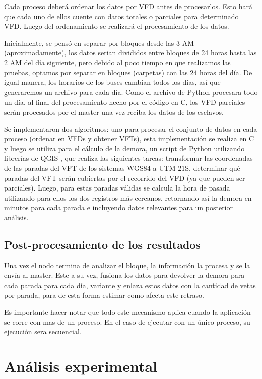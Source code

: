 \documentclass[journal]{IEEEtran}
\begin{document}
Cada proceso deberá ordenar los datos por VFD antes de procesarlos. Esto hará que cada uno de ellos cuente con datos totales o parciales para determinado VFD. Luego del ordenamiento se realizará el procesamiento de los datos.

Inicialmente, se pensó en separar por bloques desde las 3 AM (aproximadamente), los datos serian divididos entre bloques de 24 horas hasta las 2 AM del día siguiente, pero debido al poco tiempo en que realizamos las pruebas, optamos por separar en bloques (carpetas) con las 24 horas del día. De igual manera, los horarios de los buses cambian todos los días, así que generaremos un archivo para cada día. Como el archivo de Python procesara todo un día, al final del procesamiento hecho por el código en C, los VFD parciales serán procesados por el master una vez reciba los datos de los esclavos.

Se implementaron dos algoritmos: uno para procesar el
conjunto de datos en cada proceso (ordenar en VFDs y obtener VFTs), esta implementación se realiza en C y luego se utiliza para el cálculo de la demora, un script de Python utilizando librerías de QGIS \cite{qgis}, que realiza las siguientes tareas: transformar las coordenadas de las paradas del VFT de los sistemas WGS84 a UTM 21S, determinar qué paradas del VFT serán cubiertas por el recorrido del VFD (ya que pueden ser parciales). Luego, para estas paradas válidas se calcula la hora de pasada utilizando para ellos los dos registros más cercanos, retornando así la demora en minutos para cada parada e incluyendo datos relevantes para un posterior análisis. 

\subsection{Post-procesamiento de los resultados}
Una vez el nodo termina de analizar el bloque, la información la procesa y se la envía al master. Este a su vez, fusiona los datos para devolver la demora para cada parada para cada día, variante y enlaza estos datos con la cantidad de vetas por parada, para de esta forma estimar como afecta este retraso.

Es importante hacer notar que todo este mecanismo aplica cuando la aplicación se corre con mas de un proceso. En el caso de ejecutar con un único proceso, su ejecución sera secuencial.

\section{Análisis experimental}
\end{document}
